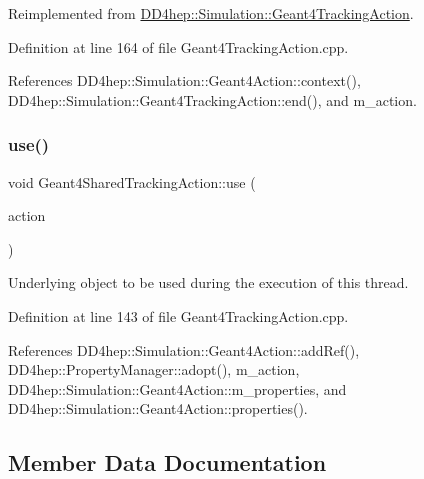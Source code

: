 Reimplemented from \hyperlink{class_d_d4hep_1_1_simulation_1_1_geant4_tracking_action_a29f980c180576781771ea325b4a73f14}{D\+D4hep\+::\+Simulation\+::\+Geant4\+Tracking\+Action}.



Definition at line 164 of file Geant4\+Tracking\+Action.\+cpp.



References D\+D4hep\+::\+Simulation\+::\+Geant4\+Action\+::context(), D\+D4hep\+::\+Simulation\+::\+Geant4\+Tracking\+Action\+::end(), and m\+\_\+action.

\hypertarget{class_d_d4hep_1_1_simulation_1_1_geant4_shared_tracking_action_a7810fb89525433a623056dcb8afb5b48}{}\label{class_d_d4hep_1_1_simulation_1_1_geant4_shared_tracking_action_a7810fb89525433a623056dcb8afb5b48} 
\subsubsection{\texorpdfstring{use()}{use()}}
{\footnotesize\ttfamily void Geant4\+Shared\+Tracking\+Action\+::use (\begin{DoxyParamCaption}\item[{\hyperlink{class_d_d4hep_1_1_simulation_1_1_geant4_tracking_action}{Geant4\+Tracking\+Action} $\ast$}]{action }\end{DoxyParamCaption})\hspace{0.3cm}{\ttfamily [virtual]}}



Underlying object to be used during the execution of this thread. 



Definition at line 143 of file Geant4\+Tracking\+Action.\+cpp.



References D\+D4hep\+::\+Simulation\+::\+Geant4\+Action\+::add\+Ref(), D\+D4hep\+::\+Property\+Manager\+::adopt(), m\+\_\+action, D\+D4hep\+::\+Simulation\+::\+Geant4\+Action\+::m\+\_\+properties, and D\+D4hep\+::\+Simulation\+::\+Geant4\+Action\+::properties().



\subsection{Member Data Documentation}
\hypertarget{class_d_d4hep_1_1_simulation_1_1_geant4_shared_tracking_action_ab28be90db22491588dd12675fd21d8cb}{}\label{class_d_d4hep_1_1_simulation_1_1_geant4_shared_tracking_action_ab28be90db22491588dd12675fd21d8cb} 
